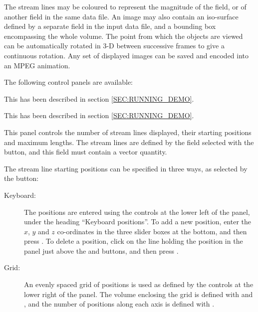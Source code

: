 The stream lines may be coloured to represent the
magnitude of the field, or of another field in the same
data file.
An image may also contain an iso-surface defined by a
separate field in the input data file, and a bounding box
encompassing the whole volume.
The point from which the objects are viewed can be automatically rotated
in 3-D between successive frames to give a continuous rotation.
Any set of displayed images can be saved and encoded
into an MPEG animation.

The following control panels are available:
\begin{description}

This has been described in section \ref{SEC:RUNNING_DEMO}.

This has been described in section \ref{SEC:RUNNING_DEMO}.

This panel controls the number of stream lines displayed, their starting
positions and maximum lengths. The stream lines are defined by the field
selected with the  button, and this field
must contain a vector quantity.

The stream line starting positions can be specified in three ways, as
selected by the  button:

\begin{description}

\item [Keyboard:]
The positions are entered using the controls at the lower left of the
panel, under the heading ``Keyboard positions''.  To add a new position,
enter the $x$, $y$ and $z$ co-ordinates in the three slider boxes at the
bottom, and then press . To delete a position, click on the
line holding the position in the panel just above the  and
 buttons, and then press .

\item [Grid:]
An evenly spaced grid of positions is used as defined by the controls at
the lower right of the panel. The volume enclosing the grid is defined
with  and , and the
number of positions along each axis is defined with .


\end{description}
\end{description}
